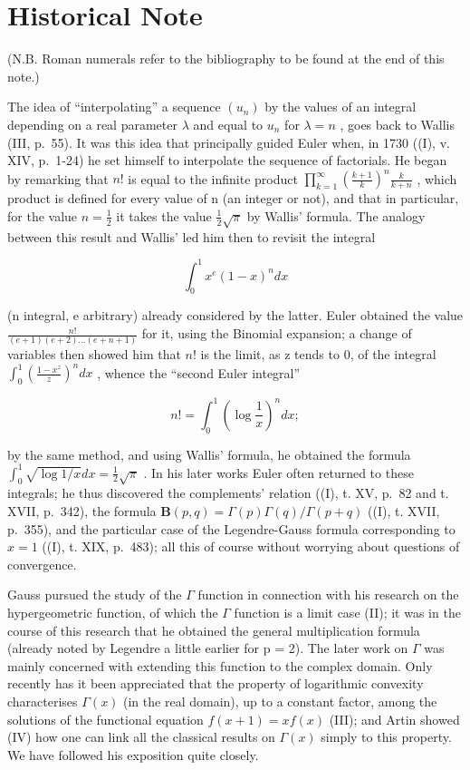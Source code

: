 \section*{Historical Note}
{}

(N.B. Roman numerals refer to the bibliography to be found at the end of this note.)

The idea of ``interpolating'' a sequence \((u_{n})\) by the values of an integral depending on a real parameter \(\lambda\) and equal to \(u_{n}\) for \(\lambda = n\) , goes back to Wallis (III, p.~55). It was this idea that principally guided Euler when, in 1730 ((I), v. XIV, p.~1-24) he set himself to interpolate the sequence of factorials. He began by remarking that \(n!\) is equal to the infinite product \(\prod_{k=1}^{\infty}\left(\frac{k+1}{k}\right)^{n}\frac{k}{k+n}\) , which product is defined for every value of n (an integer or not), and that in particular, for the value \(n = \frac{1}{2}\) it takes the value \(\frac{1}{2}\sqrt{\pi}\) by Wallis' formula. The analogy between this result and Wallis' led him then to revisit the integral

\[
\int_ {0} ^ {1} x ^ {e} (1 - x) ^ {n} d x
\]

(n integral, e arbitrary) already considered by the latter. Euler obtained the value \(\frac{n!}{(e+1)(e+2)\ldots(e+n+1)}\) for it, using the Binomial expansion; a change of variables then showed him that \(n!\) is the limit, as z tends to 0, of the integral \(\int_{0}^{1}\left(\frac{1-x^{z}}{z}\right)^{n}dx\) , whence the ``second Euler integral''

\[
n! = \int_ {0} ^ {1} \left(\log \frac {1}{x}\right) ^ {n} d x;
\]

by the same method, and using Wallis' formula, he obtained the formula \(\int_0^1\sqrt{\log 1 / x} dx = \frac{1}{2}\sqrt{\pi}\) . In his later works Euler often returned to these integrals; he thus discovered the complements' relation ((I), t. XV, p.~82 and t. XVII, p.~342), the formula \(\mathbf{B}(p,q) = \Gamma (p)\Gamma (q) / \Gamma (p + q)\) ((I), t. XVII, p.~355), and the particular case of the Legendre-Gauss formula corresponding to \(x = 1\) ((I), t. XIX, p.~483); all this of course without worrying about questions of convergence.

Gauss pursued the study of the \(\Gamma\) function in connection with his research on the hypergeometric function, of which the \(\Gamma\) function is a limit case (II); it was in the course of this research that he obtained the general multiplication formula (already noted by Legendre a little earlier for p = 2). The later work on \(\Gamma\) was mainly concerned with extending this function to the complex domain. Only recently has it been appreciated that the property of logarithmic convexity characterises \(\Gamma(x)\) (in the real domain), up to a constant factor, among the solutions of the functional equation \(f(x + 1) = x f(x)\) (III); and Artin showed (IV) how one can link all the classical results on \(\Gamma(x)\) simply to this property. We have followed his exposition quite closely.

